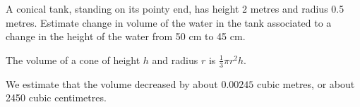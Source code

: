 \begin{question}
A conical tank, standing on its pointy end, has height 2 metres and radius 0.5 metres.
Estimate change in volume of the water in the tank associated to a change in the height of the water from 50 cm to 45 cm.
\begin{center}\end{center}
\end{question}
\begin{hint}
The volume of a cone of height $h$ and radius $r$ is
        $\frac{1}{3}\pi r^2 h$.
\end{hint}
\begin{answer}
We estimate that the volume decreased by about $0.00245$ cubic metres, or about
2450 cubic centimetres.
\end{answer}
